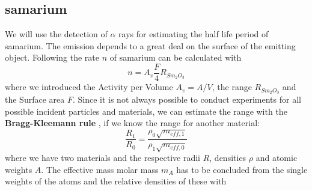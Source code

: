 \subsection{samarium}
\label{subsec:samarium_theory}
We will use the detection of $\alpha$ rays for estimating the half life period of samarium. 
The emission depends to a great deal on the surface of the emitting object.
Following \cite{ver} the rate $n$ of samarium can be calculated with
\begin{equation}
n = A_v \frac{F}{4} R_{Sm_2O_3}
\label{eq:range2}
\end{equation}
where we introduced the Activity per Volume $A_v = A/V$, the range $R_{Sm_2O_3}$ and the Surface area $F$.
Since it is not always possible to conduct experiments for all possible incident particles and materials, we
can estimate the range with the \textbf{Bragg-Kleemann rule} \cite{knoll2000radiation}, if we know
the range for another material:
\begin{equation}
    \frac{R_1}{R_0} = \frac{\rho_0 \sqrt{m_{eff,1}}}{\rho_1 \sqrt{m_{eff,0}}} 
    \label{eq:range}
\end{equation}
where we have two materials and the respective radii $R$, densities $\rho$ and atomic weights $A$. 
The effective mass molar mass $m_A$ has to be concluded from the single weights of the atoms and the relative densities of these with
